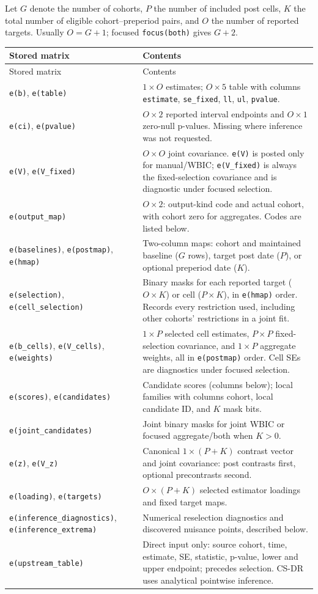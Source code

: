 \documentclass[11pt]{article}
\newcommand{\cmd}[1]{\texttt{#1}}
\begin{document}
Let $G$ denote the number of cohorts, $P$ the number of included post cells,
$K$ the total number of eligible cohort--preperiod pairs, and $O$ the number
of reported targets. Usually $O=G+1$; focused \cmd{focus(both)} gives $G+2$.

{\small
\begin{longtable}{@{}p{.36\linewidth}p{.60\linewidth}@{}}
\toprule
Stored matrix & Contents \\
\midrule
\endfirsthead
\toprule
Stored matrix & Contents \\
\midrule
\endhead
\bottomrule
\endfoot
\cmd{e(b)}, \cmd{e(table)} & $1\times O$ estimates; $O\times5$ table with columns \cmd{estimate}, \cmd{se\_fixed}, \cmd{ll}, \cmd{ul}, \cmd{pvalue}. \\
\cmd{e(ci)}, \cmd{e(pvalue)} & $O\times2$ reported interval endpoints and $O\times1$ zero-null p-values. Missing where inference was not requested. \\
\cmd{e(V)}, \cmd{e(V\_fixed)} & $O\times O$ joint covariance. \cmd{e(V)} is posted only for manual/WBIC; \cmd{e(V\_fixed)} is always the fixed-selection covariance and is diagnostic under focused selection. \\
\cmd{e(output\_map)} & $O\times2$: output-kind code and actual cohort, with cohort zero for aggregates. Codes are listed below. \\
\cmd{e(baselines)}, \cmd{e(postmap)}, \cmd{e(hmap)} & Two-column maps: cohort and maintained baseline ($G$ rows), target post date ($P$), or optional preperiod date ($K$). \\
\cmd{e(selection)}, \cmd{e(cell\_selection)} & Binary masks for each reported target ($O\times K$) or cell ($P\times K$), in \cmd{e(hmap)} order. Records every restriction used, including other cohorts' restrictions in a joint fit. \\
\cmd{e(b\_cells)}, \cmd{e(V\_cells)}, \cmd{e(weights)} & $1\times P$ selected cell estimates, $P\times P$ fixed-selection covariance, and $1\times P$ aggregate weights, all in \cmd{e(postmap)} order. Cell SEs are diagnostics under focused selection. \\
\cmd{e(scores)}, \cmd{e(candidates)} & Candidate scores (columns below); local families with columns cohort, local candidate ID, and $K$ mask bits. \\
\cmd{e(joint\_candidates)} & Joint binary masks for joint WBIC or focused aggregate/both when $K>0$. \\
\cmd{e(z)}, \cmd{e(V\_z)} & Canonical $1\times(P+K)$ contrast vector and joint covariance: post contrasts first, optional precontrasts second. \\
\cmd{e(loading)}, \cmd{e(targets)} & $O\times(P+K)$ selected estimator loadings and fixed target maps. \\
\cmd{e(inference\_diagnostics)}, \cmd{e(inference\_extrema)} & Numerical reselection diagnostics and discovered nuisance points, described below. \\
\cmd{e(upstream\_table)} & Direct input only: source cohort, time, estimate, SE, statistic, p-value, lower and upper endpoint; precedes selection. CS-DR uses analytical pointwise inference. \\
\end{longtable}}
\end{document}
